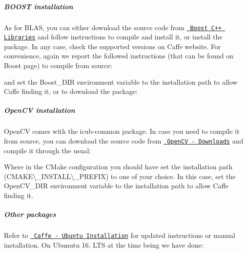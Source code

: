 \subparagraph*{B\+O\+O\+ST installation}

As for B\+L\+AS, you can either download the source code from \href{http://www.boost.org/}{\texttt{ Boost C++ Libraries}} and follow instructions to compile and install it, or install the package. In any case, check the supported versions on Caffe website. For convenience, again we report the followed instructions (that can be found on Boost page) to compile from source\+:


\begin{DoxyCode}{0}
\end{DoxyCode}
 and set the {\ttfamily Boost\+\_\+\+D\+IR} environment variable to the installation path to allow Caffe finding it, or to download the package\+:


\begin{DoxyCode}{0}
\end{DoxyCode}


\subparagraph*{Open\+CV installation}

Open\+CV comes with the {\ttfamily icub-\/common} package. In case you need to compile it from source, you can download the source code from \href{http://opencv.org/downloads.html}{\texttt{ Open\+CV -\/ Downloads}} and compile it through the usual\+:


\begin{DoxyCode}{0}
\end{DoxyCode}


Where in the C\+Make configuration you should have set the installation path ({\ttfamily C\+M\+A\+KE\textbackslash{}\+\_\+\+I\+N\+S\+T\+A\+LL\textbackslash{}\+\_\+\+P\+R\+E\+F\+IX}) to one of your choice. In this case, set the {\ttfamily Open\+C\+V\+\_\+\+D\+IR} environment variable to the installation path to allow Caffe finding it.

\subparagraph*{Other packages}

Refer to \href{http://caffe.berkeleyvision.org/install_apt.html}{\texttt{ Caffe -\/ Ubuntu Installation}} for updated instructions or manual installation. On Ubunutu 16. L\+TS at the time being we have done\+:

